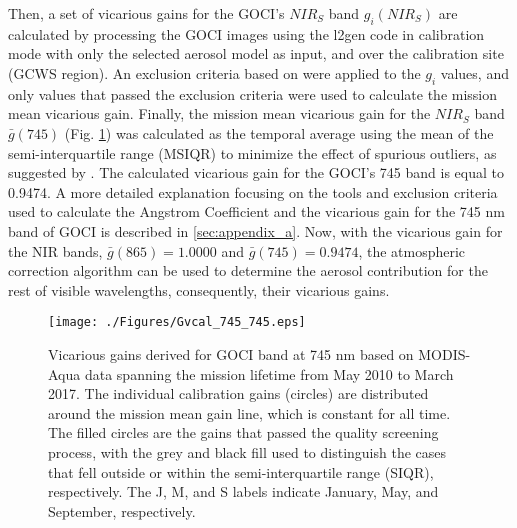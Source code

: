\documentclass[10pt]{article}
\begin{document}
Then, a set of vicarious gains for the GOCI's $NIR_S$ band $g_i(NIR_S)$ are calculated by processing the GOCI images using the l2gen code in calibration mode with only the selected aerosol model as input, and over the calibration site (GCWS region).
An exclusion criteria based on \cite{Bailey2006} were applied to the $g_i$ values, and only values that passed the exclusion criteria were used to calculate the mission mean vicarious gain.
Finally, the mission mean vicarious gain for the $NIR_S$ band $\bar{g}(745)$ (Fig. \ref{fig:Gvcal_745}) was calculated as the temporal average using the mean of the semi-interquartile range (MSIQR) to minimize the effect of spurious outliers, as suggested by \cite{Franz:07}.
The calculated vicarious gain for the GOCI's 745 band is equal to 0.9474.
A more detailed explanation focusing on the tools and exclusion criteria used to calculate the Angstrom Coefficient and the vicarious gain for the 745 nm band of GOCI is described in \autoref{sec:appendix_a}.
Now, with the vicarious gain for the NIR bands, $\bar{g}(865)=1.0000$ and $\bar{g}(745)=0.9474$, the atmospheric correction algorithm can be used to determine the aerosol contribution for the rest of visible wavelengths, consequently, their vicarious gains. 

\begin{figure}[H]
  \centering
  \texttt{[image: ./Figures/Gvcal\_745\_745.eps]}
    \caption{Vicarious gains derived for GOCI band at 745 nm based on MODIS-Aqua data spanning the mission lifetime from May 2010 to March 2017. The individual calibration gains (circles) are distributed around the mission mean gain line, which is constant for all time. The filled circles are the gains that passed the quality screening process, with the grey and black fill used to distinguish the cases that fell outside or within the semi-interquartile range (SIQR), respectively. The J, M, and S labels indicate January, May, and September, respectively.  \label{fig:Gvcal_745}} 
\end{figure}
\end{document}
